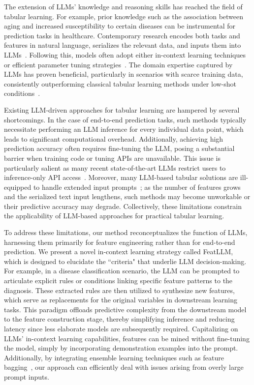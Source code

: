 The extension of LLMs’ knowledge and reasoning skills has reached the field of tabular learning. For example, prior knowledge such as the association between aging and increased susceptibility to certain diseases can be instrumental for prediction tasks in healthcare. Contemporary research encodes both tasks and features in natural language, serializes the relevant data, and inputs them into LLMs~\cite{dinh2022lift,wang2023anypredict}. Following this, models often adopt either in-context learning techniques~\cite{nam2023semi} or efficient parameter tuning strategies~\cite{dinh2022lift,hegselmann2023tabllm}. The domain expertise captured by LLMs has proven beneficial, particularly in scenarios with scarce training data, consistently outperforming classical tabular learning methods under low-shot conditions~\cite{hegselmann2023tabllm}.

Existing LLM-driven approaches for tabular learning are hampered by several shortcomings. In the case of end-to-end prediction tasks, such methods typically necessitate performing an LLM inference for every individual data point, which leads to significant computational overhead. Additionally, achieving high prediction accuracy often requires fine-tuning the LLM, posing a substantial barrier when training code or tuning APIs are unavailable. This issue is particularly salient as many recent state-of-the-art LLMs restrict users to inference-only API access~\cite{anil2023palm,openai2023gpt4}. Moreover, many LLM-based tabular solutions are ill-equipped to handle extended input prompts~\cite{liu2023lost}; as the number of features grows and the serialized text input lengthens, such methods may become unworkable or their predictive accuracy may degrade. Collectively, these limitations constrain the applicability of LLM-based approaches for practical tabular learning.

To address these limitations, our method reconceptualizes the function of LLMs, harnessing them primarily for feature engineering rather than for end-to-end prediction. We present a novel in-context learning strategy called \textsf{FeatLLM}, which is designed to elucidate the ``criteria" that underlie LLM decision-making. For example, in a disease classification scenario, the LLM can be prompted to articulate explicit rules or conditions linking specific feature patterns to the diagnosis. These extracted rules are then utilized to synthesize new features, which serve as replacements for the original variables in downstream learning tasks. This paradigm offloads predictive complexity from the downstream model to the feature construction stage, thereby simplifying inference and reducing latency since less elaborate models are subsequently required. Capitalizing on LLMs’ in-context learning capabilities, features can be mined without fine-tuning the model, simply by incorporating demonstration examples into the prompt. Additionally, by integrating ensemble learning techniques such as feature bagging~\cite{breiman2001random}, our approach can efficiently deal with issues arising from overly large prompt inputs.


